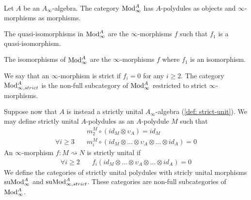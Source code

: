 \documentclass[../thesis.tex]{subfiles}
\begin{document}

            \begin{definition}
                Let $A$ be an $A_\infty$-algebra. The category $\tt{Mod}_\infty^A$ has $A$-polydules as objects and $\infty$-morphisms as morphisms.

            \end{definition}

            The quasi-isomorphisms in $\tt{Mod}_\infty^A$ are the $\infty$-morphisms $f$ such that $f_1$ is a quasi-isomorphism.

            \begin{remark}
                The isomorphisms of $\tt{Mod}_\infty^A$ are the $\infty$-morphisms $f$ where $f_1$ is an isomorphism.
            \end{remark}

            We say that an $\infty$-morphism is strict if $f_i = 0$ for any $i\geq 2$. The category $\tt{Mod}_{\infty, strict}^A$ is the non-full subcategory of $\tt{Mod}_\infty^A$ restricted to strict $\infty$-morphisms.

            Suppose now that $A$ is instead a strictly unital $A_\infty$-algebra (\ref{def: strict-unit}). We may define strictly unital $A$-polydules as an $A$-polydule $M$ such that
            \begin{align*}
                & m^M_2\circ (id_M \otimes \upsilon_A) = id_M \\
                \forall i\geq 3\quad & m^M_i\circ (id_M \otimes ... \otimes \upsilon_A \otimes ... \otimes id_A) = 0
            \end{align*}
            An $\infty$-morphism $f : M \rightsquigarrow N$ is strictly unital if
            \begin{align*}
                \forall i\geq 2 \quad & f_i(id_M \otimes ... \otimes \upsilon_A \otimes ... \otimes id_A) = 0 
            \end{align*}
            We define the categories of strictly unital polydules with stricly unital morphisms $\tt{suMod}_\infty^A$ and $\tt{suMod}_{\infty, strict}^A$. These categories are non-full subcategories of $\tt{Mod}_\infty^A$.
\end{document}

